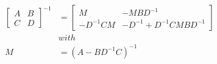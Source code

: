 \begin{lemma}

    \begin{align*}
        \left[\begin{array}{cc}
                  A&B\\
                  C&D
        \end{array}\right]^{-1}&=\left[\begin{array}{cc}
                                           M&-MBD^{-1}\\
                                           -D^{-1}CM&-D^{-1}+D^{-1}CMBD^{-1}
                                        \end{array}\right]\\
        &with\\
        M&=(A-BD^{-1}C)^{-1}
    \end{align*}

    \label{lemma:inverseOfBlockMatrix}
\end{lemma}

